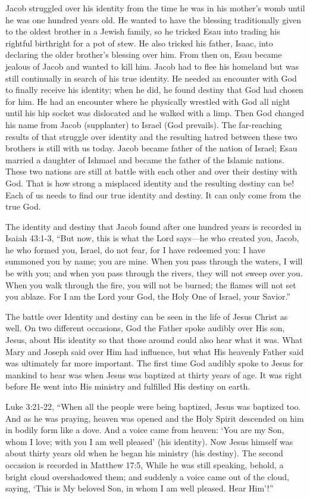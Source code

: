 \documentclass[oneside]{book}
\begin{document}
Jacob struggled over his identity from the time he was in his mother’s womb until he was one hundred years old. He wanted to have the blessing traditionally given to the oldest brother in a Jewish family, so he tricked Esau into trading his rightful birthright for a pot of stew. He also tricked his father, Isaac, into declaring the older brother’s blessing over him. From then on, Esau became jealous of Jacob and wanted to kill him. Jacob had to flee his homeland but was still continually in search of his true identity. He needed an encounter with God to finally receive his identity; when he did, he found destiny that God had chosen for him. He had an encounter where he physically wrestled with God all night until his hip socket was dislocated and he walked with a limp. Then God changed his name from Jacob (supplanter) to Israel (God prevails). The far-reaching results of that struggle over identity and the resulting hatred between these two brothers is still with us today. Jacob became father of the nation of Israel; Esau married a daughter of Ishmael and became the father of the Islamic nations. These two nations are still at battle with each other and over their destiny with God. That is how strong a misplaced identity and the resulting destiny can be! Each of us needs to find our true identity and destiny. It can only come from the true God.


The identity and destiny that Jacob found after one hundred years is recorded in Isaiah 43:1-3, “But now, this is what the Lord says—he who created you, Jacob, he who formed you, Israel, do not fear, for I have redeemed you: I have summoned you by name; you are mine. When you pass through the waters, I will be with you; and when you pass through the rivers, they will not sweep over you. When you walk through the fire, you will not be burned; the flames will not set you ablaze. For I am the Lord your God, the Holy One of Israel, your Savior.”

The battle over Identity and destiny can be seen in the life of Jesus Christ as well. On two different occasions, God the Father spoke audibly over His son, Jesus, about His identity so that those around could also hear what it was. What Mary and Joseph said over Him had influence, but what His heavenly Father said was ultimately far more important. The first time God audibly spoke to Jesus for mankind to hear was when Jesus was baptized at thirty years of age. It was right before He went into His ministry and fulfilled His destiny on earth.

Luke 3:21-22, “When all the people were being baptized, Jesus was baptized too. And as he was praying, heaven was opened and the Holy Spirit descended on him in bodily form like a dove. And a voice came from heaven: ‘You are my Son, whom I love; with you I am well pleased’ (his identity). Now Jesus himself was about thirty years old when he began his ministry (his destiny). The second occasion is recorded in Matthew 17:5, While he was still speaking, behold, a bright cloud overshadowed them; and suddenly a voice came out of the cloud, saying, ‘This is My beloved Son, in whom I am well pleased. Hear Him’!”
\end{document}
